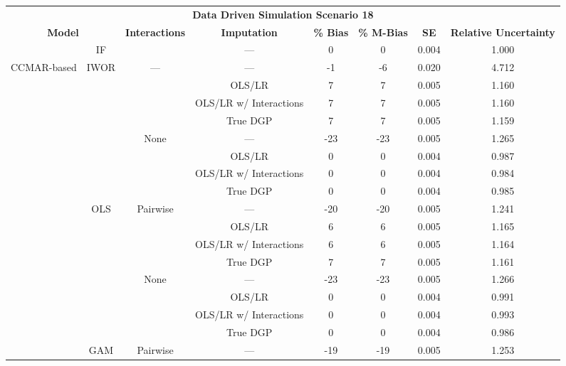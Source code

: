 \begin{table}
\centering
\begin{tabular}[ht]{|>{}c|c|c|c|c|c|c|>{}c|}
\hline
\multicolumn{8}{|c|}{\textbf{Data Driven Simulation Scenario 18}} \\
\cline{1-8}
\multicolumn{2}{|c|}{\textbf{Model}} & \textbf{Interactions} & \textbf{Imputation} & \textbf{\% Bias} & \textbf{\% M-Bias} & \textbf{SE} & \textbf{Relative Uncertainty}\\
\hline
 & IF &  & --- & 0 & 0 & 0.004 & 1.000\\
\cline{2-2}
\cline{4-8}
\multirow{-2}{*}{\centering\arraybackslash CCMAR-based} & IWOR & \multirow{-2}{*}{\centering\arraybackslash ---} & --- & -1 & -6 & 0.020 & 4.712\\
\cline{1-8}
 &  &  & OLS/LR & 7 & 7 & 0.005 & 1.160\\
\cline{4-8}
 &  &  & OLS/LR w/ Interactions & 7 & 7 & 0.005 & 1.160\\
\cline{4-8}
 &  &  & True DGP & 7 & 7 & 0.005 & 1.159\\
\cline{4-8}
 &  & \multirow{-4}{*}{\centering\arraybackslash None} & --- & -23 & -23 & 0.005 & 1.265\\
\cline{3-8}
 &  &  & OLS/LR & 0 & 0 & 0.004 & 0.987\\
\cline{4-8}
 &  &  & OLS/LR w/ Interactions & 0 & 0 & 0.004 & 0.984\\
\cline{4-8}
 &  &  & True DGP & 0 & 0 & 0.004 & 0.985\\
\cline{4-8}
 & \multirow{-8}{*}{\centering\arraybackslash OLS} & \multirow{-4}{*}{\centering\arraybackslash Pairwise} & --- & -20 & -20 & 0.005 & 1.241\\
\cline{2-8}
 &  &  & OLS/LR & 6 & 6 & 0.005 & 1.165\\
\cline{4-8}
 &  &  & OLS/LR w/ Interactions & 6 & 6 & 0.005 & 1.164\\
\cline{4-8}
 &  &  & True DGP & 7 & 7 & 0.005 & 1.161\\
\cline{4-8}
 &  & \multirow{-4}{*}{\centering\arraybackslash None} & --- & -23 & -23 & 0.005 & 1.266\\
\cline{3-8}
 &  &  & OLS/LR & 0 & 0 & 0.004 & 0.991\\
\cline{4-8}
 &  &  & OLS/LR w/ Interactions & 0 & 0 & 0.004 & 0.993\\
\cline{4-8}
 &  &  & True DGP & 0 & 0 & 0.004 & 0.986\\
\cline{4-8}
 & \multirow{-8}{*}{\centering\arraybackslash GAM} & \multirow{-4}{*}{\centering\arraybackslash Pairwise} & --- & -19 & -19 & 0.005 & 1.253\\

\end{tabular}
\end{table}
